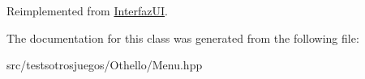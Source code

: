 Reimplemented from \hyperlink{class_interfaz_u_i_a2a80214a4387c21c34a617a8a96996ca}{Interfaz\+UI}.



The documentation for this class was generated from the following file\+:\begin{DoxyCompactItemize}
\item 
src/testsotrosjuegos/\+Othello/Menu.\+hpp\end{DoxyCompactItemize}

